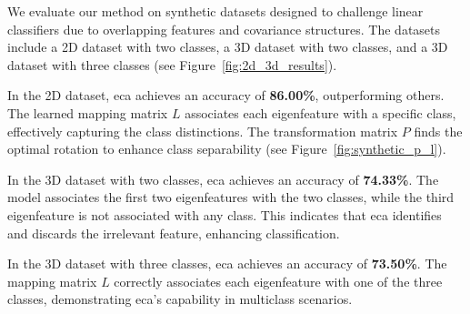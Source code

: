 \documentclass[lettersize,journal]{IEEEtran}
\begin{document}
We evaluate our method on synthetic datasets designed to challenge linear classifiers due to overlapping features and covariance structures. The datasets include a 2D dataset with two classes, a 3D dataset with two classes, and a 3D dataset with three classes (see Figure~\ref{fig:2d_3d_results}).

In the 2D dataset, \Gls{eca} achieves an accuracy of \textbf{86.00\%}, outperforming others. The learned mapping matrix \( L \) associates each eigenfeature with a specific class, effectively capturing the class distinctions. The transformation matrix \( P \) finds the optimal rotation to enhance class separability (see Figure~\ref{fig:synthetic_p_l}).

In the 3D dataset with two classes, \Gls{eca} achieves an accuracy of \textbf{74.33\%}. The model associates the first two eigenfeatures with the two classes, while the third eigenfeature is not associated with any class. This indicates that \Gls{eca} identifies and discards the irrelevant feature, enhancing classification.

In the 3D dataset with three classes, \Gls{eca} achieves an accuracy of \textbf{73.50\%}. The mapping matrix \( L \) correctly associates each eigenfeature with one of the three classes, demonstrating \Gls{eca}'s capability in multiclass scenarios.
\end{document}
